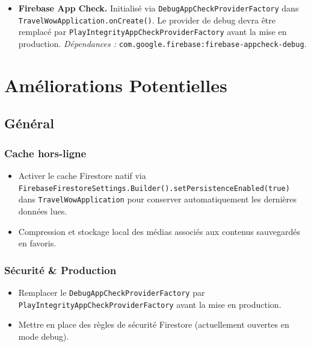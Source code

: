 \documentclass[a4paper, 12pt]{article}
\begin{document}
\begin{justify}
\begin{itemize}
    \item \textbf{Firebase App Check.}
    Initialisé via \texttt{DebugAppCheckProviderFactory} dans \texttt{TravelWowApplication.\allowbreak{}onCreate()}. Le provider de debug devra être remplacé par \texttt{PlayIntegrityAppCheckProviderFactory} avant la mise en production.
    \newline\textit{Dépendances :} \texttt{com.\allowbreak{}google.\allowbreak{}firebase:\allowbreak{}firebase-appcheck-debug}.

\end{itemize}



\section*{Améliorations Potentielles}



\subsection*{Général}

\subsubsection*{Cache hors-ligne}

\begin{itemize}
    \item Activer le cache Firestore natif via \texttt{FirebaseFirestoreSettings.\allowbreak{}Builder().\allowbreak{}setPersistenceEnabled(true)} dans \texttt{TravelWowApplication} pour conserver automatiquement les dernières données lues.
    \item Compression et stockage local des médias associés aux contenus sauvegardés en favoris.
\end{itemize}

\subsubsection*{Sécurité \& Production}

\begin{itemize}
    \item Remplacer le \texttt{DebugAppCheckProviderFactory} par \texttt{PlayIntegrityAppCheckProviderFactory} avant la mise en production.
    \item Mettre en place des règles de sécurité Firestore (actuellement ouvertes en mode debug).
\end{itemize}


\end{justify}
\end{document}
